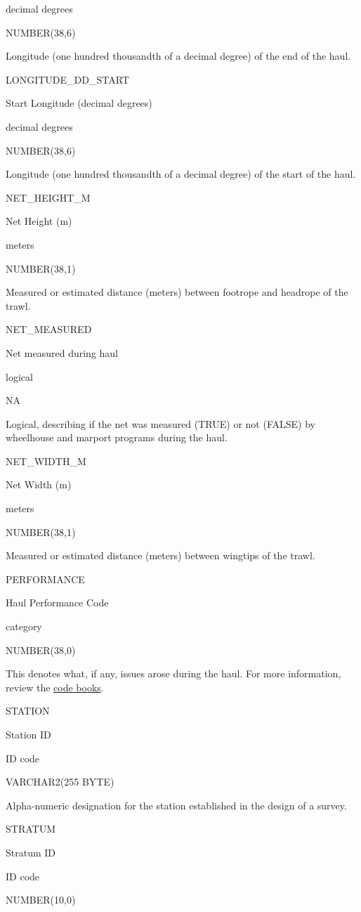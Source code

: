 \documentclass[
  letterpaper,
  oneside,
  open=any]{scrbook}
\begin{document}
decimal degrees

NUMBER(38,6)

Longitude (one hundred thousandth of a decimal degree) of the end of the
haul.

LONGITUDE\_DD\_START

Start Longitude (decimal degrees)

decimal degrees

NUMBER(38,6)

Longitude (one hundred thousandth of a decimal degree) of the start of
the haul.

NET\_HEIGHT\_M

Net Height (m)

meters

NUMBER(38,1)

Measured or estimated distance (meters) between footrope and headrope of
the trawl.

NET\_MEASURED

Net measured during haul

logical

NA

Logical, describing if the net was measured (TRUE) or not (FALSE) by
wheelhouse and marport programs during the haul.

NET\_WIDTH\_M

Net Width (m)

meters

NUMBER(38,1)

Measured or estimated distance (meters) between wingtips of the trawl.

PERFORMANCE

Haul Performance Code

category

NUMBER(38,0)

This denotes what, if any, issues arose during the haul. For more
information, review the
\href{https://www.fisheries.noaa.gov/resource/document/groundfish-survey-species-code-manual-and-data-codes-manual}{code
books}.

STATION

Station ID

ID code

VARCHAR2(255 BYTE)

Alpha-numeric designation for the station established in the design of a
survey.

STRATUM

Stratum ID

ID code

NUMBER(10,0)
\end{document}
